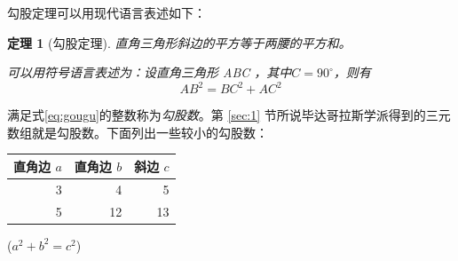 \documentclass[UTF8]{ctexart}
\newcommand{\degree}{^\circ}
\newtheorem{thm}{定理}
\begin{document}
勾股定理可以用现代语言表述如下：

\begin{thm}[勾股定理]
    直角三角形斜边的平方等于两腰的平方和。

    可以用符号语言表述为：设直角三角形 ABC ，其中$C=90\degree$，则有
    \begin{equation}\label{eq:gougu}
        AB^2 = BC^2 + AC^2 
    \end{equation}
\end{thm}


满足式\eqref{eq:gougu}的整数称为\emph{勾股数}。第 \ref{sec:1} 节所说毕达哥拉斯学派得到的三元数组就是勾股数。下面列出一些较小的勾股数：

\begin{table}[H]
    \begin{tabular}{|rrr|}
        \hline
        直角边 $a$ & 直角边 $b$ & 斜边 $c$ \\ 
        \hline
        3 & 4 & 5 \\ 
        5 & 12 & 13 \\ 
        \hline
    \end{tabular}%
    \qquad
    ($a^2 + b^2 = c^2$)
\end{table}

\nocite{Shiye}

\end{document}
